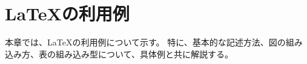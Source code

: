 \documentclass[a4paper,11pt,oneside,openany]{jsbook}
\begin{document}
\chapter{\LaTeX の利用例}
本章では、\LaTeX の利用例について示す。
特に、基本的な記述方法、図の組み込み方、表の組み込み型について、具体例と共に解説する。






%
\end{document}
